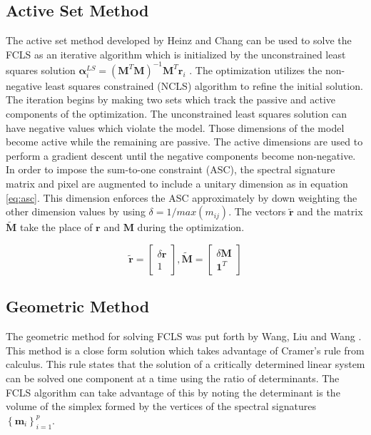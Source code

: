 \documentclass[journal]{IEEEtran}
\begin{document}
\subsection{Active Set Method}
The active set method developed by Heinz and Chang can be used to solve the FCLS as an iterative algorithm which is initialized by the unconstrained least squares solution \(\mathbf{\alpha}_i^{LS} = \left(\mathbf{M}^T\mathbf{M}\right)^{-1}\mathbf{M}^T\mathbf{r}_i\) \cite{heinz}. The optimization utilizes the non-negative least squares constrained (NCLS) algorithm to refine the initial solution. The iteration begins by making two sets which track the passive and active components of the optimization. The unconstrained least squares solution can have negative values which violate the model. Those dimensions of the model become active while the remaining are passive. The active dimensions are used to perform a gradient descent until the negative components become non-negative. In order to impose the sum-to-one constraint (ASC), the spectral signature matrix and pixel are augmented to include a unitary dimension as in equation \ref{eq:asc}. This dimension enforces the ASC approximately by down weighting the other dimension values by using \(\delta = 1/max{(m_{ij})}\). The vectors \(\mathbf{\tilde{r}}\) and the matrix \(\mathbf{\tilde{M}}\) take the place of \(\mathbf{r}\) and \(\mathbf{M}\) during the optimization.

\begin{equation}
\label{eq:asc}
\mathbf{\tilde{r}} = \begin{bmatrix}
\delta\mathbf{r} \\ 1
\end{bmatrix},
\mathbf{\tilde{M}} = \begin{bmatrix}
\delta \mathbf{M} \\ \mathbf{1}^T
\end{bmatrix}
\end{equation}

\subsection{Geometric Method}
The geometric method for solving FCLS was put forth by Wang, Liu and Wang \cite{liguo}. This method is a close form solution which takes advantage of Cramer's rule from calculus. This rule states that the solution of a critically determined linear system can be solved one component at a time using the ratio of determinants. The FCLS algorithm can take advantage of this by noting the determinant is the volume of the simplex formed by the vertices of the spectral signatures \(\left\{\mathbf{m}_i\right\}_{i=1}^p\).
\end{document}

